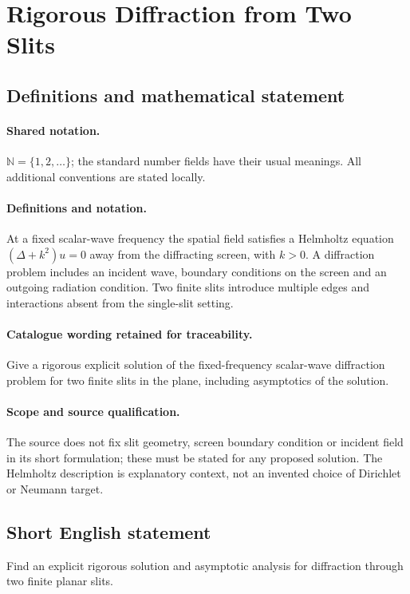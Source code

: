 \documentclass[11pt]{article}
\begin{document}
\section{Rigorous Diffraction from Two Slits}\label{statement}

\subsection{Definitions and mathematical statement}

\paragraph{Shared notation.}$\mathbb N=\{1,2,\ldots\}$; the standard number fields have their usual meanings. All additional conventions are stated locally.


\paragraph{Definitions and notation.}At a fixed scalar-wave frequency the spatial field satisfies a Helmholtz equation $(\Delta+k^2)u=0$ away from the diffracting screen, with $k>0$. A diffraction problem includes an incident wave, boundary conditions on the screen and an outgoing radiation condition. Two finite slits introduce multiple edges and interactions absent from the single-slit setting.

\paragraph{Catalogue wording retained for traceability.}
Give a rigorous explicit solution of the fixed-frequency scalar-wave diffraction problem for two finite slits in the plane, including asymptotics of the solution.
\paragraph{Scope and source qualification.}The source does not fix slit geometry, screen boundary condition or incident field in its short formulation; these must be stated for any proposed solution. The Helmholtz description is explanatory context, not an invented choice of Dirichlet or Neumann target.
\subsection{Short English statement}
Find an explicit rigorous solution and asymptotic analysis for diffraction through two finite planar slits.
\end{document}
